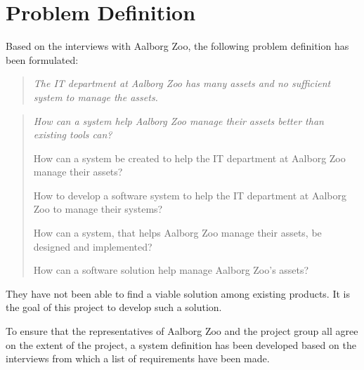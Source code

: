\section{Problem Definition}
Based on the interviews with Aalborg Zoo, the following problem definition has been formulated:

\begin{quote}
    \textit{The IT department at Aalborg Zoo has many assets and no sufficient system to manage the assets.}
\end{quote}

\begin{quote}
    \textit{How can a system help Aalborg Zoo manage their assets better than existing tools can?}
    
    How can a system be created to help the IT department at Aalborg Zoo manage their assets?
    
    How to develop a software system to help the IT department at Aalborg Zoo to manage their systems?
    
    How can a system, that helps Aalborg Zoo manage their assets, be designed and implemented?
    
    How can a software solution help manage Aalborg Zoo's assets?
\end{quote}

They have not been able to find a viable solution among existing products. It is the goal of this project to develop such a solution.
\par
To ensure that the representatives of Aalborg Zoo and the project group all agree on the extent of the project, a system definition has been developed based on the interviews from which a list of requirements have been made.